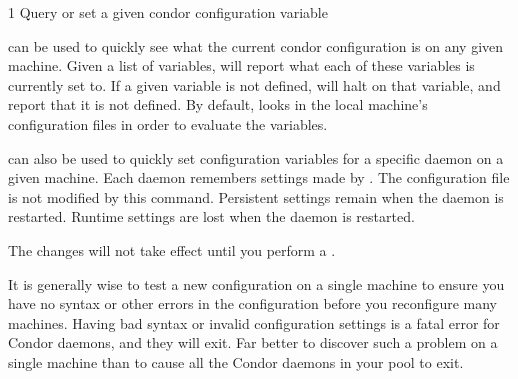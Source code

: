 \begin{ManPage}{\label{man-condor-config-val}}{1}
{Query or set a given condor configuration variable}
\Synopsis {}








\Description

 can be used to quickly see what the current
condor configuration is on any given machine.  Given a list of
variables,  will report what each of these
variables is currently set to.  If a given variable is not defined,
 will halt on that variable, and report that it is
not defined.  By default,  looks in the local
machine's configuration files in order to evaluate the variables.

 can also be used to quickly set configuration
variables for a specific daemon on a given machine.  Each daemon
remembers settings made by .  The configuration
file is not modified by this command.  Persistent settings remain when
the daemon is restarted.  Runtime settings are lost when the daemon is
restarted.  

\Note The changes will not take effect until you perform a
.

\Note It is generally wise to test a new configuration on a single
machine to ensure you have no syntax or other errors in the
configuration before you reconfigure many machines.  
Having bad syntax or invalid configuration settings is a fatal error
for Condor daemons, and they will exit.
Far better to discover such a problem on a single machine than to
cause all the Condor daemons in your pool to exit.


\end{ManPage}
